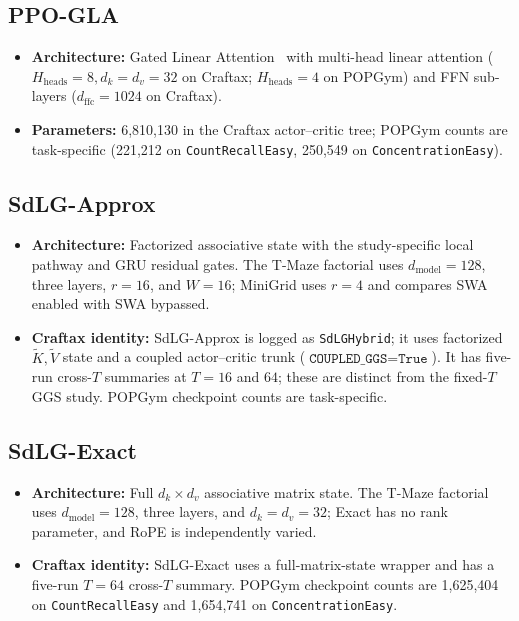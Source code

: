 \subsection{PPO-GLA}
\begin{itemize}
    \item \textbf{Architecture:} Gated Linear Attention~\cite{yang2024gated} with multi-head linear attention ($H_{\text{heads}}=8, d_k = d_v = 32$ on Craftax; $H_{\text{heads}}=4$ on POPGym) and FFN sub-layers ($d_{\text{ffc}}=1024$ on Craftax).
    \item \textbf{Parameters:} 6,810,130 in the Craftax actor--critic tree; POPGym counts are task-specific (221,212 on \texttt{CountRecallEasy}, 250,549 on \texttt{ConcentrationEasy}).
\end{itemize}

\subsection{SdLG-Approx}
\begin{itemize}
    \item \textbf{Architecture:} Factorized associative state with the study-specific local pathway and GRU residual gates. The T-Maze factorial uses $d_{\text{model}}=128$, three layers, $r=16$, and $W=16$; MiniGrid uses $r=4$ and compares SWA enabled with SWA bypassed.
    \item \textbf{Craftax identity:} SdLG-Approx is logged as \texttt{SdLGHybrid}; it uses factorized $\widetilde K,\widetilde V$ state and a coupled actor--critic trunk ($\texttt{COUPLED\_GGS}=\texttt{True}$). It has five-run cross-$T$ summaries at $T=16$ and $64$; these are distinct from the fixed-$T$ GGS study. POPGym checkpoint counts are task-specific.
\end{itemize}

\subsection{SdLG-Exact}
\begin{itemize}
    \item \textbf{Architecture:} Full $d_k\times d_v$ associative matrix state. The T-Maze factorial uses $d_{\text{model}}=128$, three layers, and $d_k=d_v=32$; Exact has no rank parameter, and RoPE is independently varied.
    \item \textbf{Craftax identity:} SdLG-Exact uses a full-matrix-state wrapper and has a five-run $T=64$ cross-$T$ summary. POPGym checkpoint counts are 1,625,404 on \texttt{CountRecallEasy} and 1,654,741 on \texttt{ConcentrationEasy}.
\end{itemize}


